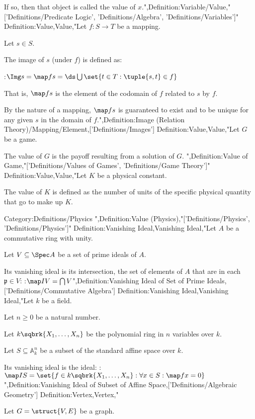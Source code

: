 If so, then that object is called the value of $x$.",Definition:Variable/Value,"['Definitions/Predicate Logic', 'Definitions/Algebra', 'Definitions/Variables']"
Definition:Value,Value,"Let $f: S \to T$ be a mapping.

Let $s \in S$.

The image of $s$ (under $f$) is defined as:

:$\Img s = \map f s = \ds \bigcup \set {t \in T: \tuple {s, t} \in f}$

That is, $\map f s$ is the element of the codomain of $f$ related to $s$ by $f$.


By the nature of a mapping, $\map f s$ is guaranteed to exist and to be unique for any given $s$ in the domain of $f$.",Definition:Image (Relation Theory)/Mapping/Element,['Definitions/Images']
Definition:Value,Value,"Let $G$ be a game.


The value of $G$ is the payoff resulting from a solution of $G$.
",Definition:Value of Game,"['Definitions/Values of Games', 'Definitions/Game Theory']"
Definition:Value,Value,"Let $K$ be a physical constant.

The value of $K$ is defined as the number of units of the specific physical quantity that go to make up $K$.


Category:Definitions/Physics
",Definition:Value (Physics),"['Definitions/Physics', 'Definitions/Physics']"
Definition:Vanishing Ideal,Vanishing Ideal,"Let $A$ be a commutative ring with unity.

Let $V \subseteq \Spec A$ be a set of prime ideals of $A$.


Its vanishing ideal is its intersection, the set of elements of $A$ that are in each $\mathfrak p \in V$:
:$\map I V = \bigcap V$",Definition:Vanishing Ideal of Set of Prime Ideals,['Definitions/Commutative Algebra']
Definition:Vanishing Ideal,Vanishing Ideal,"Let $k$ be a field.

Let $n \ge 0$ be a natural number.

Let $k \sqbrk {X_1, \ldots, X_n}$ be the polynomial ring in $n$ variables over $k$.

Let $S \subseteq \mathbb A^n_k$ be a subset of the standard affine space over $k$.


Its vanishing ideal is the ideal:
:$\map I S = \set {f \in k \sqbrk {X_1, \ldots, X_n} : \forall x \in S : \map f x = 0}$",Definition:Vanishing Ideal of Subset of Affine Space,['Definitions/Algebraic Geometry']
Definition:Vertex,Vertex,"

Let $G = \struct {V, E}$ be a graph.

